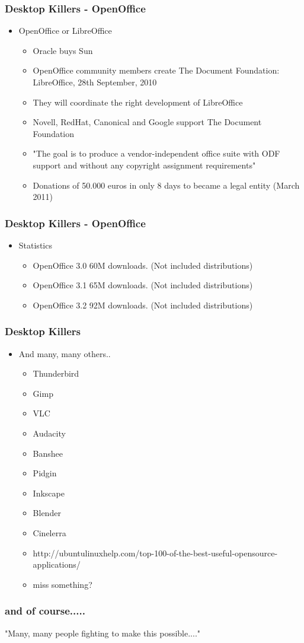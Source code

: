 \documentclass{beamer}
\begin{document}
\begin{frame}
\frametitle{Desktop Killers - OpenOffice}

\begin{itemize}
\item OpenOffice or LibreOffice
\begin {itemize}
	\item Oracle buys Sun
	\item OpenOffice community members create The Document Foundation: LibreOffice, 28th September, 2010
	\item They will coordinate the right development of LibreOffice
	\item Novell, RedHat, Canonical and Google support The Document Foundation
	\item "The goal is to produce a vendor-independent office suite with ODF support and without any copyright assignment requirements"
	\item Donations of 50.000 euros in only 8 days to became a legal entity (March 2011)
\end {itemize}
\end{itemize}

\end{frame}

\begin{frame}
\frametitle{Desktop Killers - OpenOffice}


\begin{itemize}
\item Statistics
	\begin {itemize}
	\item OpenOffice 3.0 60M downloads. (Not included distributions)
	\item OpenOffice 3.1 65M downloads. (Not included distributions)
	\item OpenOffice 3.2 92M downloads. (Not included distributions)
	\end {itemize}
\end{itemize}

\end{frame}

\begin{frame}
\frametitle{Desktop Killers }

\begin{itemize}
\item And many, many others..
\begin{itemize}
\item Thunderbird
\item Gimp
\item VLC
\item Audacity
\item Banshee
\item Pidgin
\item Inkscape
\item Blender
\item Cinelerra
\item http://ubuntulinuxhelp.com/top-100-of-the-best-useful-opensource-applications/
\item miss something?
\end{itemize}
\end{itemize}

\end{frame}

\begin{frame}
\frametitle{and of course.....}

"Many, many people fighting to make this possible...."

\end{frame}
\end{document}
